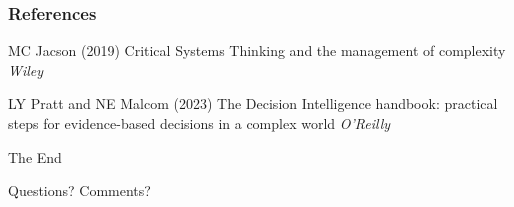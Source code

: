 \documentclass[
	11pt, %
]{beamer}
\begin{document}

\begin{frame} %
	\frametitle{References}
	
	\begin{thebibliography}{99} %
		\footnotesize %
		
			MC Jacson (2019)
			\newblock Critical Systems Thinking and the management of complexity
			\newblock \emph{Wiley}
			
			LY Pratt and NE Malcom (2023)
			\newblock The Decision Intelligence handbook: practical steps for evidence-based decisions in a complex world
			\newblock \emph{O'Reilly}
	\end{thebibliography}
\end{frame}


\begin{frame}[plain] %
	\begin{center}
		{\Huge The End}
		
		\bigskip\bigskip %
		
		{\LARGE Questions? Comments?}
	\end{center}
\end{frame}

\end{document}
